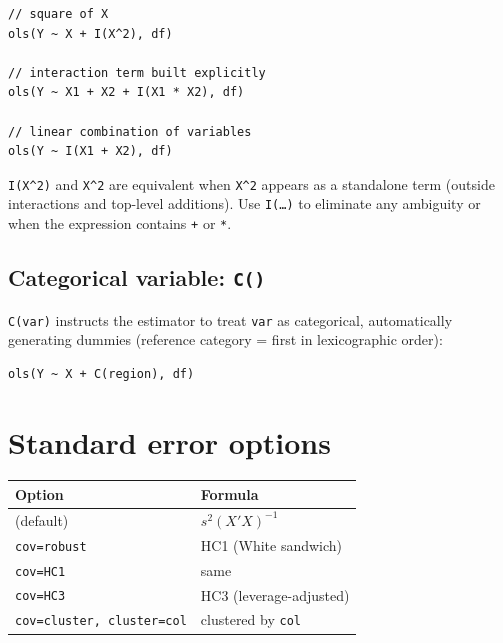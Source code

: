 \begin{lstlisting}[caption={Arbitrary terms with \texttt{I()}}]
// square of X
ols(Y ~ X + I(X^2), df)

// interaction term built explicitly
ols(Y ~ X1 + X2 + I(X1 * X2), df)

// linear combination of variables
ols(Y ~ I(X1 + X2), df)
\end{lstlisting}

\begin{nota}
  \texttt{I(X\textasciicircum{}2)} and \texttt{X\textasciicircum{}2} are equivalent when
  \texttt{X\textasciicircum{}2} appears as a standalone term (outside interactions and
  top-level additions). Use \texttt{I(\ldots)} to eliminate any ambiguity
  or when the expression contains \texttt{+} or \texttt{*}.
\end{nota}

\subsection{Categorical variable: \texttt{C()}}
\label{subsec:formula-categorical}

\texttt{C(var)} instructs the estimator to treat \texttt{var} as
categorical, automatically generating dummies (reference category = first
in lexicographic order):

\begin{lstlisting}
ols(Y ~ X + C(region), df)
\end{lstlisting}

\section{Standard error options}

\begin{center}
\begin{tabular}{ll}
\toprule
\textbf{Option} & \textbf{Formula} \\
\midrule
(default)                           & $s^2(X'X)^{-1}$ \\
\texttt{cov=robust}                 & HC1 (White sandwich) \\
\texttt{cov=HC1}                    & same \\
\texttt{cov=HC3}                    & HC3 (leverage-adjusted) \\
\texttt{cov=cluster, cluster=col}   & clustered by \texttt{col} \\
\bottomrule
\end{tabular}
\end{center}


